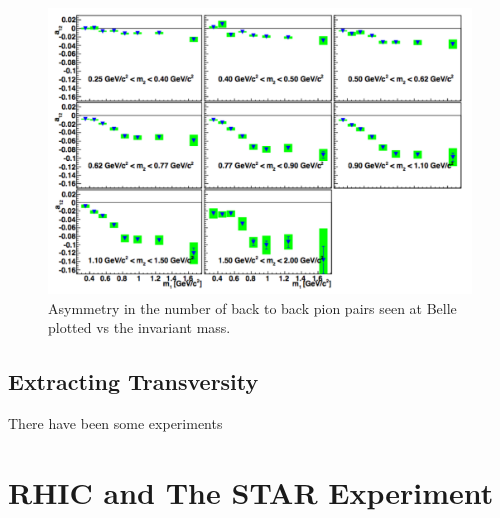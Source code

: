 \documentclass[abstract = on,listof=totoc, bibliography=totoc]{scrreprt}
\begin{document}
 \begin{figure}
\begin{center}
\includegraphics[width = 1\textwidth]{BelleAnnModulationM}
\caption[Asymmetry seen in $e^-e^+$ annihilation at Belle]{Asymmetry in the number of back to back pion pairs seen at Belle plotted vs the invariant mass.}
\label{fig:BelleMod}
\end{center}
\end{figure}

\section{Extracting Transversity}

There have been some experiments 



\chapter{RHIC and The STAR Experiment}
\end{document}
